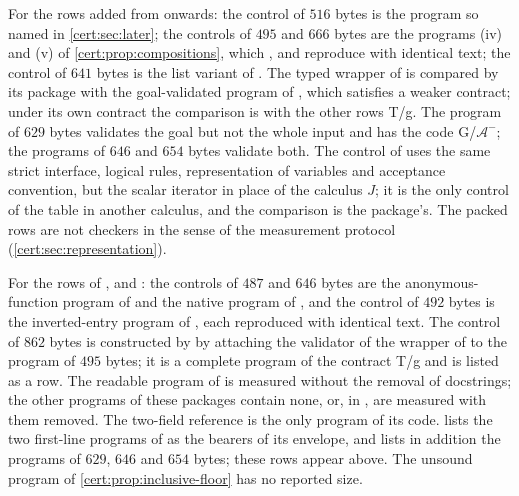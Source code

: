 For the rows added from  onwards: the control of
$516$ bytes is the program so named in \cref{cert:sec:later}; the controls of
$495$ and $666$ bytes are the programs (iv) and (v) of
\cref{cert:prop:compositions}, which ,
 and  reproduce with identical
text; the control of $641$ bytes is the list variant of .
The typed wrapper of  is compared by its package with
the goal-validated program of , which satisfies a
weaker contract; under its own contract the comparison is with the other rows
T/g. The program of $629$ bytes validates the goal but not the whole input and
has the code G/$\mathcal A^{-}$; the programs of $646$ and $654$ bytes validate
both. The control of  uses the same strict interface,
logical rules, representation of variables and acceptance convention, but the
scalar iterator in place of the calculus $J$; it is the only control of the
table in another calculus, and the comparison is the package's. The packed
rows are not checkers in the sense of the measurement protocol
(\cref{cert:sec:representation}).

For the rows of ,  and
: the controls of $487$ and $646$ bytes are the
anonymous-function program of  and the native program of
, and the control of $492$ bytes is the
inverted-entry program of , each reproduced with
identical text. The control of $862$ bytes is constructed by
 by attaching the validator of the wrapper of
 to the program of $495$ bytes; it is a complete
program of the contract T/g and is listed as a row. The readable program of
 is measured without the removal of docstrings; the other
programs of these packages contain none, or, in ,
are measured with them removed. The two-field reference is the only program of its
code.  lists the two first-line programs of
 as the bearers of its envelope, and
 lists in addition the programs of $629$, $646$
and $654$ bytes; these rows appear above. The unsound program of
\cref{cert:prop:inclusive-floor} has no reported size.


